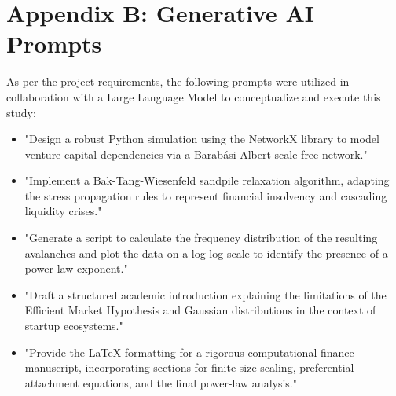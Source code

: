 \documentclass[12pt, a4paper, titlepage]{article}
\begin{document}
\section*{Appendix B: Generative AI Prompts}
As per the project requirements, the following prompts were utilized in collaboration with a Large Language Model to conceptualize and execute this study:
\begin{itemize}
    \item "Design a robust Python simulation using the NetworkX library to model venture capital dependencies via a Barab\'asi-Albert scale-free network."
    \item "Implement a Bak-Tang-Wiesenfeld sandpile relaxation algorithm, adapting the stress propagation rules to represent financial insolvency and cascading liquidity crises."
    \item "Generate a script to calculate the frequency distribution of the resulting avalanches and plot the data on a log-log scale to identify the presence of a power-law exponent."
    \item "Draft a structured academic introduction explaining the limitations of the Efficient Market Hypothesis and Gaussian distributions in the context of startup ecosystems."
    \item "Provide the LaTeX formatting for a rigorous computational finance manuscript, incorporating sections for finite-size scaling, preferential attachment equations, and the final power-law analysis."
\end{itemize}
\end{document}
